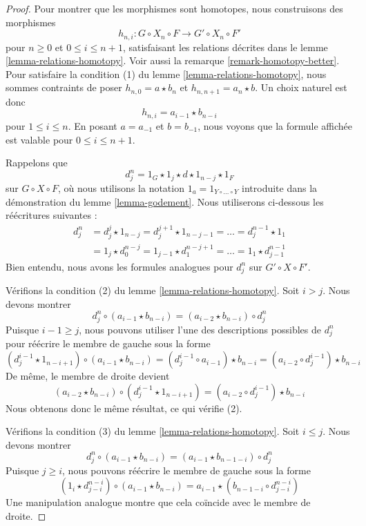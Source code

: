 \begin{proof}
Pour montrer que les morphismes sont homotopes, nous construisons des morphismes
$$
h_{n, i} : G \circ X_n \circ F \to G' \circ X_n \circ F'
$$
pour $n \geq 0$ et $0 \leq i \leq n + 1$, satisfaisant les relations décrites
dans le lemme \ref{lemma-relations-homotopy}. Voir aussi la remarque
\ref{remark-homotopy-better}. Pour satisfaire la condition (1) du lemme
\ref{lemma-relations-homotopy}, nous sommes contraints de poser
$h_{n, 0} = a \star b_n$ et $h_{n , n + 1} = a_n \star b$.
Un choix naturel est donc
$$
h_{n , i} = a_{i - 1} \star b_{n - i}
$$
pour $1 \leq i \leq n$. En posant $a = a_{-1}$ et $b = b_{-1}$, nous voyons
que la formule affichée est valable pour $0 \leq i \leq n + 1$.

\medskip\noindent
Rappelons que
$$
d^n_j = 1_G \star 1_j \star d \star 1_{n - j} \star 1_F
$$
sur $G \circ X \circ F$, où nous utilisons la notation
$1_a = 1_{Y \circ \ldots \circ Y}$ introduite dans la démonstration du lemme
\ref{lemma-godement}. Nous utiliserons ci-dessous les réécritures suivantes :
\begin{align*}
d^n_j
& =
d^j_j \star 1_{n - j} =
d^{j + 1}_j \star 1_{n - j - 1} = \ldots = d^{n - 1}_j \star 1_1 \\
& =
1_j \star d^{n - j}_0 = 1_{j - 1} \star d^{n - j + 1}_1 = \ldots =
1_1 \star d^{n - 1}_{j - 1}
\end{align*}
Bien entendu, nous avons les formules analogues pour $d^n_j$ sur
$G' \circ X \circ F'$.

\medskip\noindent
Vérifions la condition (2) du lemme \ref{lemma-relations-homotopy}.
Soit $i > j$. Nous devons montrer
$$
d^n_j \circ (a_{i - 1} \star b_{n - i}) =
(a_{i - 2} \star b_{n - i}) \circ d^n_j
$$
Puisque $i - 1 \geq j$, nous pouvons utiliser l'une des descriptions possibles
de $d^n_j$ pour réécrire le membre de gauche sous la forme
$$
(d^{i - 1}_j \star 1_{n - i + 1}) \circ (a_{i - 1} \star b_{n - i}) =
(d^{i - 1}_j \circ a_{i - 1}) \star b_{n - i} =
(a_{i - 2} \circ d^{i - 1}_j) \star b_{n - i}
$$
De même, le membre de droite devient
$$
(a_{i - 2} \star b_{n - i}) \circ (d^{i - 1}_j \star 1_{n - i + 1}) =
(a_{i - 2} \circ d^{i - 1}_j) \star b_{n - i}
$$
Nous obtenons donc le même résultat, ce qui vérifie (2).

\medskip\noindent
Vérifions la condition (3) du lemme \ref{lemma-relations-homotopy}.
Soit $i \leq j$. Nous devons montrer
$$
d^n_j \circ (a_{i - 1} \star b_{n - i}) =
(a_{i - 1} \star b_{n - 1 - i}) \circ d^n_j
$$
Puisque $j \geq i$, nous pouvons réécrire le membre de gauche sous la forme
$$
(1_i \star d^{n - i}_{j - i}) \circ (a_{i - 1} \star b_{n - i}) =
a_{i - 1} \star (b_{n - 1 - i} \circ d^{n - i}_{j - i})
$$
Une manipulation analogue montre que cela coïncide avec le membre de droite.


\end{proof}
